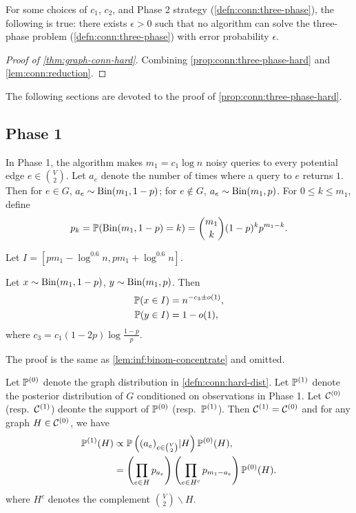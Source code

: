 \begin{proposition} \label{prop:conn:three-phase-hard}
  For some choices of $c_1$, $c_2$, and Phase 2 strategy (\cref{defn:conn:three-phase}), the following is true:
  there exists $\epsilon>0$ such that no algorithm can solve the three-phase problem (\cref{defn:conn:three-phase}) with error probability $\epsilon$.
\end{proposition}

\begin{proof}[Proof of \cref{thm:graph-conn-hard}]
  Combining \cref{prop:conn:three-phase-hard} and \cref{lem:conn:reduction}.
\end{proof}

The following sections are devoted to the proof of \cref{prop:conn:three-phase-hard}.

\subsection{Phase 1} \label{sec:conn:phase-1}
In Phase 1, the algorithm makes $m_1=c_1 \log n$ noisy queries to every potential edge $e\in \binom V2$.
Let $a_e$ denote the number of times where a query to $e$ returns $1$.
Then for $e\in G$, $a_e\sim \operatorname{\mathrm{Bin}}(m_1, 1-p)$; for $e\not \in G$, $a_e \sim \operatorname{\mathrm{Bin}}(m_1, p)$.
For $0\le k\le m_1$, define
\begin{align*}
  p_k = \mathbb{P}(\operatorname{\mathrm{Bin}}(m_1, 1-p) = k) = \binom{m_1}{k} (1-p)^k p^{m_1 - k}.
\end{align*}

Let $I = \left[p m_1 - \log^{0.6}n, p m_1 + \log^{0.6}n\right]$.
\begin{lemma} \label{lem:conn:binom-concentrate}
  Let $x\sim \operatorname{\mathrm{Bin}}(m_1, 1-p)$, $y\sim \operatorname{\mathrm{Bin}}(m_1, p)$.
  Then
  \begin{align}
    \label{eqn:lem-conn-binom-concentrate:i} \mathbb{P}(x\in I) &= n^{-c_3 \pm o(1)}, \\
    \label{eqn:lem-conn-binom-concentrate:ii} \mathbb{P}(y\in I) &= 1-o(1),
  \end{align}
  where $c_3 = c_1 (1-2p) \log \frac{1-p}p$.
\end{lemma}
The proof is the same as \cref{lem:inf:binom-concentrate} and omitted.


Let $\mathbb{P}^{(0)}$ denote the graph distribution in \cref{defn:conn:hard-dist}.
Let $\mathbb{P}^{(1)}$ denote the posterior distribution of $G$ conditioned on observations in Phase 1.
Let $\mathcal{C}^{(0)}$ (resp.~$\mathcal{C}^{(1)}$) deonte the support of $\mathbb{P}^{(0)}$ (resp.~$\mathbb{P}^{(1)}$).
Then $\mathcal{C}^{(1)} = \mathcal{C}^{(0)}$ and for any graph $H \in \mathcal{C}^{(0)}$, we have
\begin{align} \label{eqn:conn-phase-1:post}
  \mathbb{P}^{(1)}(H) &\propto \mathbb{P}\left((a_e)_{e\in \binom V2}| H\right) \mathbb{P}^{(0)}(H),\\
  \nonumber &= \left(\prod_{e\in H} p_{a_e}\right)\left(\prod_{e\in H^c} p_{m_1 - a_e}\right) \mathbb{P}^{(0)}(H).
\end{align}
where $H^c$ denotes the complement $\binom V2\backslash H$.

